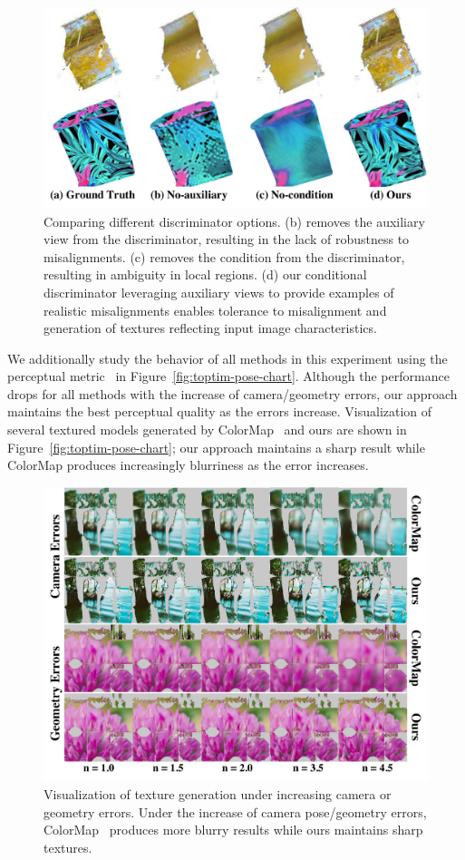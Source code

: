 \begin{figure}
    \centering
    \includegraphics[width=0.6\linewidth]{texturegen/figures/adversarial-compare.pdf}
    \caption{Comparing different discriminator options. (b) removes the auxiliary view from the discriminator, resulting in the lack of robustness to misalignments. (c) removes the condition from the discriminator, resulting in ambiguity in local regions. (d) our conditional discriminator leveraging auxiliary views to provide examples of realistic misalignments enables tolerance to misalignment and generation of textures reflecting input image characteristics. }
    \label{fig:toptim-gan-err}
\end{figure}

We additionally study the behavior of all methods in this experiment using the perceptual metric~\cite{zhang2018unreasonable} in Figure~\ref{fig:toptim-pose-chart}.
Although the performance drops for all methods with the increase of camera/geometry errors, our approach maintains the best perceptual quality as the errors increase. Visualization of several textured models generated by ColorMap~\cite{zhou2014color} and ours are shown in Figure~\ref{fig:toptim-pose-chart}; our approach maintains a sharp result while ColorMap produces increasingly blurriness as the error increases. 

\begin{figure}
    \centering
    \includegraphics[width=0.8\linewidth]{texturegen/figures/results-synth-diff.pdf}
    \caption{Visualization of texture generation under increasing camera or geometry errors. Under the increase of camera pose/geometry errors, ColorMap~\cite{zhou2014color} produces more blurry results while ours maintains sharp textures.}
    \label{fig:pose-diff}
\end{figure}


